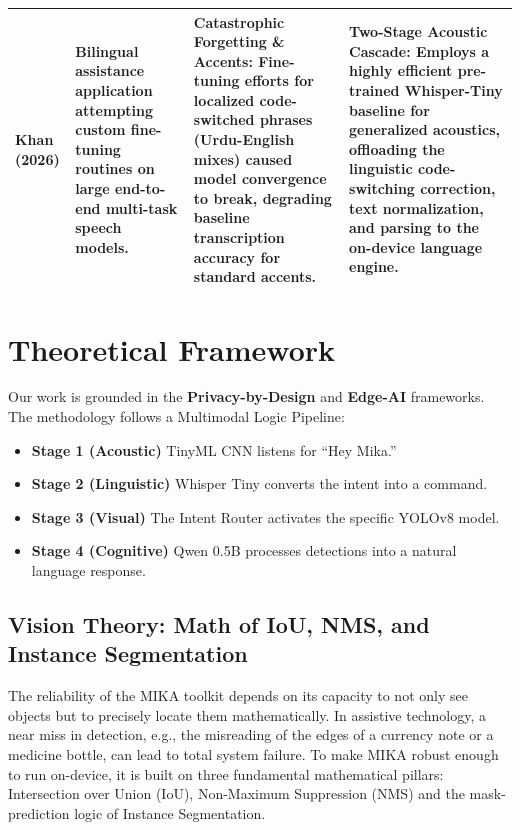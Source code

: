 \documentclass[12pt,a4paper]{report}
\begin{document}
{\begin{xltabular}{\textwidth}{|>{\raggedright\arraybackslash}p{2.2cm}|>{\raggedright\arraybackslash}p{3.2cm}|X|X|}
        \textbf{Khan (2026)} & 
        Bilingual assistance application attempting custom fine-tuning routines on large end-to-end multi-task speech models. & 
        \textbf{Catastrophic Forgetting \& Accents:} Fine-tuning efforts for localized code-switched phrases (Urdu-English mixes) caused model convergence to break, degrading baseline transcription accuracy for standard accents. & 
        \textbf{Two-Stage Acoustic Cascade:} Employs a highly efficient pre-trained Whisper-Tiny baseline for generalized acoustics, offloading the linguistic code-switching correction, text normalization, and parsing to the on-device language engine. \\ \hline
    \end{xltabular}
}
 
 
\section{Theoretical Framework}
Our work is grounded in the \textbf{Privacy-by-Design} and \textbf{Edge-AI} frameworks. The methodology follows a Multimodal Logic Pipeline:
\begin{itemize}[label=•]
    \item \textbf{Stage 1 (Acoustic)} TinyML CNN listens for ``Hey Mika.''
    \item \textbf{Stage 2 (Linguistic)} Whisper Tiny converts the intent into a command.
    \item \textbf{Stage 3 (Visual)} The Intent Router activates the specific YOLOv8 model.
    \item \textbf{Stage 4 (Cognitive)} Qwen 0.5B processes detections into a natural language response.
\end{itemize}

 
\subsection{Vision Theory: Math of IoU, NMS, and Instance Segmentation}
 
The reliability of the MIKA toolkit depends on its capacity to not only see objects but to precisely locate them mathematically. In assistive technology, a near miss in detection, e.g., the misreading of the edges of a currency note or a medicine bottle, can lead to total system failure. To make MIKA robust enough to run on-device, it is built on three fundamental mathematical pillars: Intersection over Union (IoU), Non-Maximum Suppression (NMS) and the mask-prediction logic of Instance Segmentation.  
\end{document}

